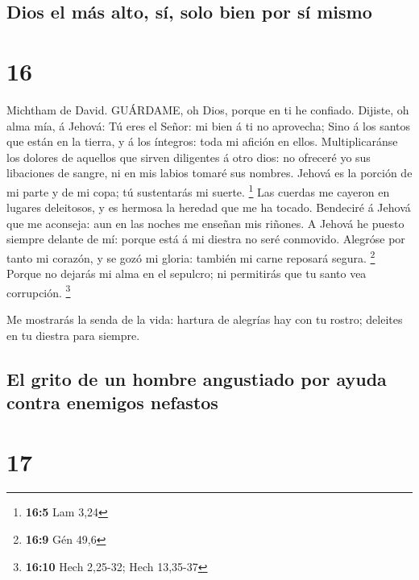 \hypertarget{dios-el-muxe1s-alto-suxed-solo-bien-por-suxed-mismo}{%
\subsection{Dios el más alto, sí, solo bien por sí
mismo}\label{dios-el-muxe1s-alto-suxed-solo-bien-por-suxed-mismo}}

\hypertarget{section-15}{%
\section{16}\label{section-15}}

 Michtham de David. GUÁRDAME, oh Dios, porque en ti he
confiado.  Dijiste, oh alma mía, á Jehová: Tú eres el Señor:
mi bien á ti no aprovecha;  Sino á los santos que están en
la tierra, y á los íntegros: toda mi afición en ellos. 
Multiplicaránse los dolores de aquellos que sirven diligentes á otro
dios: no ofreceré yo sus libaciones de sangre, ni en mis labios tomaré
sus nombres.  Jehová es la porción de mi parte y de mi copa;
tú sustentarás mi suerte. \footnote{\textbf{16:5} Lam 3,24} 
Las cuerdas me cayeron en lugares deleitosos, y es hermosa la heredad
que me ha tocado.  Bendeciré á Jehová que me aconseja: aun
en las noches me enseñan mis riñones.  A Jehová he puesto
siempre delante de mí: porque está á mi diestra no seré conmovido.
 Alegróse por tanto mi corazón, y se gozó mi gloria: también
mi carne reposará segura. \footnote{\textbf{16:9} Gén 49,6}
 Porque no dejarás mi alma en el sepulcro; ni permitirás
que tu santo vea corrupción. \footnote{\textbf{16:10} Hech 2,25-32; Hech
  13,35-37}

 Me mostrarás la senda de la vida: hartura de alegrías hay
con tu rostro; deleites en tu diestra para siempre.

\hypertarget{el-grito-de-un-hombre-angustiado-por-ayuda-contra-enemigos-nefastos}{%
\subsection{El grito de un hombre angustiado por ayuda contra enemigos
nefastos}\label{el-grito-de-un-hombre-angustiado-por-ayuda-contra-enemigos-nefastos}}

\hypertarget{section-16}{%
\section{17}\label{section-16}}

